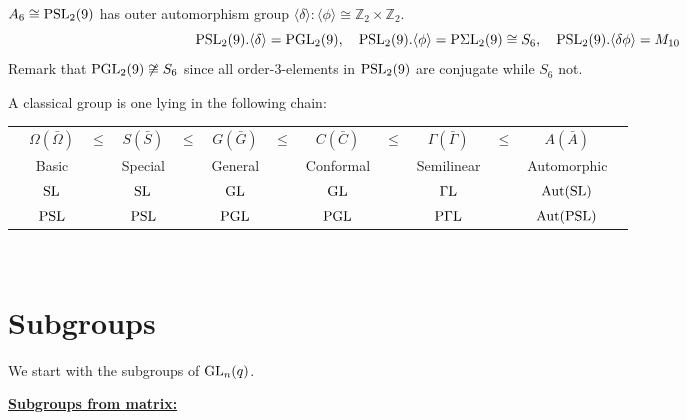 \documentclass[a4paper,11pt]{article}
\def\subtitle#1{\section{#1}}
\begin{document}
\begin{example}
    $A_6\cong \mathrm{PSL}_2(9)$ has outer automorphism group $\langle\delta\rangle:\langle\phi\rangle\cong\mathbb{Z}_2\times\mathbb{Z}_2$.
    \[ \mathrm{PSL}_2(9).\langle\delta\rangle=\mathrm{PGL}_2(9),\quad \mathrm{PSL}_2(9).\langle\phi\rangle=\mathrm{P\Sigma L}_2(9)\cong S_6,\quad \mathrm{PSL}_2(9).\langle\delta\phi\rangle=M_{10} \]
    Remark that $\mathrm{PGL}_2(9)\not\cong S_6$ since all order-3-elements in $\mathrm{PSL}_2(9)$ are conjugate while $S_6$ not.
\end{example}

\begin{definition} A classical group is one lying in the following chain:
    \begin{table*}[htbp]
        \centering
        \begin{tabular}{ccccccccccccc}
            &$\Omega (\bar{\Omega}) $&$\leq$&$ S (\bar{S}) $&$\leq $&$G (\bar{G})$&$\leq $&$C (\bar{C})$&$\leq $&$\Gamma (\bar{\Gamma})$&$\leq $&$A (\bar{A})$\\
            &Basic & & Special & & General & & Conformal & & Semilinear & & Automorphic \\ \midrule
            & $\mathrm{SL}$ & & $\mathrm{SL}$ & & $\mathrm{GL}$ & & $\mathrm{GL}$ & & $\mathrm{\Gamma L}$ & & $\mathrm{Aut}(\mathrm{SL})$ \\
            &$\mathrm{PSL}$ & & $\mathrm{PSL}$ & & $\mathrm{PGL}$ & & $\mathrm{PGL}$ & & $\mathrm{P\Gamma L}$ & & $\mathrm{Aut}(\mathrm{PSL})$ 
        \end{tabular}
    \end{table*}
\end{definition}
\ 

\subtitle{Subgroups}

We start with the subgroups of $\mathrm{GL}_n(q)$.

\noindent\textbf{\underline{Subgroups from matrix:}}
\end{document}
